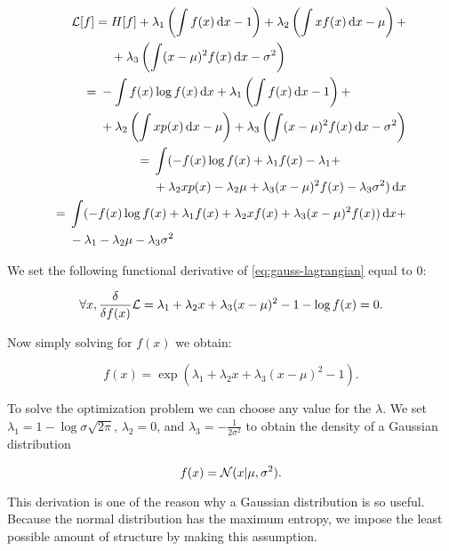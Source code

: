 \begin{align}
  \begin{split}
    \gL[f] ={}& H[f] + \lambda_1 \left( \int f(x) \dx - 1 \right) + \lambda_2 \left( \int x f(x) \dx - \mu \right) + \\
              &+ \lambda_3 \left( \int (x - \mu)^2 f(x) \dx - \sigma^2 \right)
  \end{split} \\
  \begin{split}
    ={}& -\int f(x) \log f(x) \dx  + \lambda_1 \left( \int f(x) \dx - 1 \right) + \\
       &+ \lambda_2 \left( \int x p(x) \dx - \mu \right) + \lambda_3 \left( \int (x - \mu)^2  f(x) \dx - \sigma^2 \right)
  \end{split} \\
  \begin{split}
    ={}& \int ( - f(x) \log f(x) + \lambda_1 f(x) - \lambda_1 + \\
       &+ \lambda_2 x p(x) - \lambda_2 \mu + \lambda_3 (x - \mu)^2  f(x) - \lambda_3 \sigma^2 ) \dx \\
  \end{split} \\
  \begin{split}
    ={}& \int ( - f(x)\log f(x) + \lambda_1 f(x) + \lambda_2 x f(x) + \lambda_3 (x - \mu)^2  f(x) ) \dx + \\
       &- \lambda_1 - \lambda_2 \mu - \lambda_3 \sigma^2 \label{eq:gauss-lagrangian}
  \end{split}
\end{align}

 We set the following functional derivative of
\eqref{eq:gauss-lagrangian} equal to $0$:

\begin{equation}
  \forall x, \frac{\delta}{\delta f(x)} {\mathcal{L}} = \lambda_1 + \lambda_2 x + \lambda_3 (x - \mu)^2 - 1 - \log f(x) = 0.
\end{equation}

Now simply solving for $f(x)$ we obtain:

\begin{equation}
  f(x) = \exp \left( \lambda_1 + \lambda_2 x + \lambda_3 (x - \mu)^2 - 1 \right).
\end{equation}


To solve the optimization problem we can choose any value for the $\lambda$. We
set $\lambda_1 = 1 - \log \sigma \sqrt{2 \pi}$, $\lambda_2 = 0$, and $\lambda_3
= - \frac{1}{2 \sigma^2}$ to obtain the density of a Gaussian distribution

\begin{equation}
  f(x) = {\mathcal{N}}(x | \mu, \sigma^2).
\end{equation}

This derivation is one of the reason why a Gaussian distribution is so useful.
 Because the normal distribution has the maximum
entropy, we impose the least possible amount of structure by making this
assumption.

